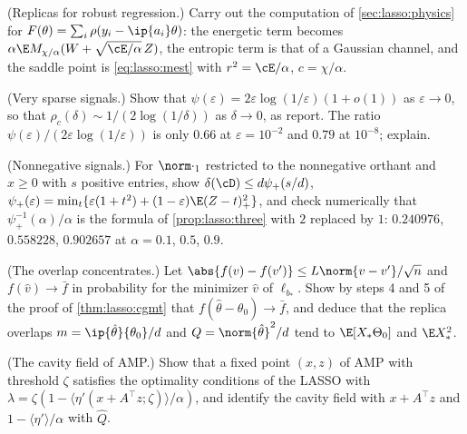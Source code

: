 \begin{refsection}
\begin{exercises}
\item \byhand\hard (Replicas for robust regression.) Carry out the computation of \cref{sec:lasso:physics} for $F(\theta)=\sum_i\rho(y_i-\ip{a_i}\theta)$: the energetic term becomes $\alpha\E M_{\chi/\alpha}(W+\sqrt{\cE/\alpha}\,Z)$, the entropic term is that of a Gaussian channel, and the saddle point is \eqref{eq:lasso:mest} with $r^2=\cE/\alpha$, $c=\chi/\alpha$. \label{ex:lasso:robustreplica}

\item \byhand (Very sparse signals.) Show that $\psi(\varepsilon)=2\varepsilon\log(1/\varepsilon)(1+o(1))$ as $\varepsilon\to0$, so that $\rho_c(\delta)\sim1/(2\log(1/\delta))$ as $\delta\to0$, as \textcite{DonohoMalekiMontanari2009} report. The ratio $\psi(\varepsilon)/(2\varepsilon\log(1/\varepsilon))$ is only $0.66$ at $\varepsilon=10^{-2}$ and $0.79$ at $10^{-8}$; explain. \label{ex:lasso:sparse}

\item \byhand (Nonnegative signals.) For $\norm\cdot_1$ restricted to the nonnegative orthant and $x\ge0$ with $s$ positive entries, show $\delta(\cD)\le d\psi_+(s/d)$, $\psi_+(\varepsilon)=\min_t\{\varepsilon(1+t^2)+(1-\varepsilon)\E(Z-t)_+^2\}$, and check numerically that $\psi_+^{-1}(\alpha)/\alpha$ is the formula of \cref{prop:lasso:three} with $2$ replaced by $1$: $0.240976$, $0.558228$, $0.902657$ at $\alpha=0.1$, $0.5$, $0.9$.\label{ex:lasso:positive}

\item \translate (The overlap concentrates.) Let $\abs{f(v)-f(v')}\le L\norm{v-v'}/\sqrt n$ and $f(\hat v)\to\bar f$ in probability for the minimizer $\hat v$ of $\ell_{b_*}$. Show by steps 4 and 5 of the proof of \cref{thm:lasso:cgmt} that $f(\hat\theta-\theta_0)\to\bar f$, and deduce that the replica overlaps $m=\ip{\hat\theta}{\theta_0}/d$ and $Q=\norm{\hat\theta}^2/d$ tend to $\E[X_*\Theta_0]$ and $\E X_*^2$.\label{ex:lasso:overlap}

\item \translate (The cavity field of AMP.) Show that a fixed point $(x,z)$ of AMP with threshold $\zeta$ satisfies the optimality conditions of the LASSO with $\lambda=\zeta(1-\langle\eta'(x+A^\top z;\zeta)\rangle/\alpha)$, and identify the cavity field with $x+A^\top z$ and $1-\langle\eta'\rangle/\alpha$ with $\hat Q$.\label{ex:lasso:ampfixed}


\end{exercises}
\end{refsection}
